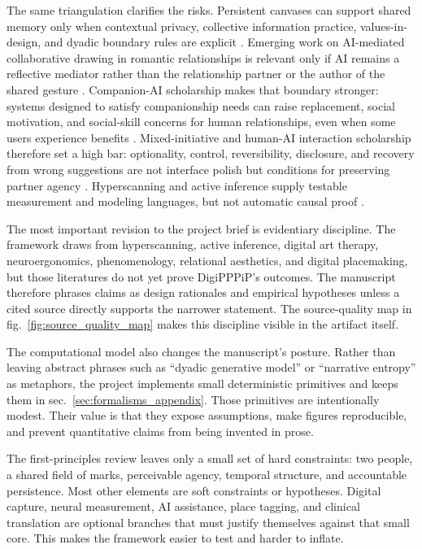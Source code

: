 \documentclass[
  english,
]{article}
\begin{document}
The same triangulation clarifies the risks. Persistent canvases can
support shared memory only when contextual privacy, collective
information practice, values-in-design, and dyadic boundary rules are
explicit
\citep{nissenbaum2011contextualprivacy, palen2003privacy, dourish2006collectiveprivacy, petronio2020cpm, shilton2012values}.
Emerging work on AI-mediated collaborative drawing in romantic
relationships is relevant only if AI remains a reflective mediator
rather than the relationship partner or the author of the shared gesture
\citep{won2026venus}. Companion-AI scholarship makes that boundary
stronger: systems designed to satisfy companionship needs can raise
replacement, social motivation, and social-skill concerns for human
relationships, even when some users experience benefits
\citep{malfacini2025companionai}. Mixed-initiative and human-AI
interaction scholarship therefore set a high bar: optionality, control,
reversibility, disclosure, and recovery from wrong suggestions are not
interface polish but conditions for preserving partner agency
\citep{horvitz1999mixedinitiative, deterding2017mixedinitiative, amershi2019humanai}.
Hyperscanning and active inference supply testable measurement and
modeling languages, but not automatic causal proof
\citep{friston2017process, hamilton2021hyperscanning}.

The most important revision to the project brief is evidentiary
discipline. The framework draws from hyperscanning, active inference,
digital art therapy, neuroergonomics, phenomenology, relational
aesthetics, and digital placemaking, but those literatures do not yet
prove DigiPPPiP's outcomes. The manuscript therefore phrases claims as
design rationales and empirical hypotheses unless a cited source
directly supports the narrower statement. The source-quality map in
fig.~\ref{fig:source_quality_map} makes this discipline visible in the
artifact itself.

The computational model also changes the manuscript's posture. Rather
than leaving abstract phrases such as ``dyadic generative model'' or
``narrative entropy'' as metaphors, the project implements small
deterministic primitives and keeps them in
sec.~\ref{sec:formalisms_appendix}. Those primitives are intentionally
modest. Their value is that they expose assumptions, make figures
reproducible, and prevent quantitative claims from being invented in
prose.

The first-principles review leaves only a small set of hard constraints:
two people, a shared field of marks, perceivable agency, temporal
structure, and accountable persistence. Most other elements are soft
constraints or hypotheses. Digital capture, neural measurement, AI
assistance, place tagging, and clinical translation are optional
branches that must justify themselves against that small core. This
makes the framework easier to test and harder to inflate.
\end{document}
